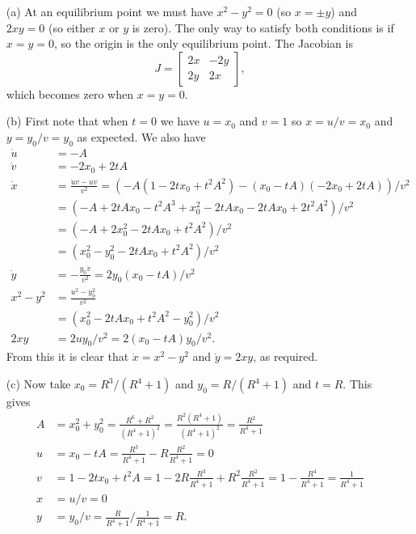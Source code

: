\documentclass[a4paper]{amsart}
\begin{document}
\begin{solution}\leavevmode
 \begin{itemize}
  \item[(a)] At an equilibrium point we must have $x^2-y^2=0$ (so
   $x=\pm y$) and $2xy=0$ (so either $x$ or $y$ is zero).  The only
   way to satisfy both conditions is if $x=y=0$, so the origin is the
   only equilibrium point.  The Jacobian is 
   \[ J=\left[\begin{array}{cc} 2x&-2y\\ 2y&2x\end{array}\right], \]
   which becomes zero when $x=y=0$.
  \item[(b)] First note that when $t=0$ we have $u=x_0$ and $v=1$ so
   $x=u/v=x_0$ and $y=y_0/v=y_0$ as expected.  We also have
   \begin{align*}
    \dot{u} &= -A \\
    \dot{v} &= -2x_0 +2tA \\
    \dot{x} &= \frac{\dot{u}v-u\dot{v}}{v^2} 
             = (-A(1-2tx_0+t^2A^2)-(x_0-tA)(-2x_0+2tA))/v^2 \\
            &= (-A+2tAx_0-t^2A^3+x_0^2-2tAx_0-2tAx_0+2t^2A^2)/v^2 \\
            &= (-A+2x_0^2-2tAx_0+t^2A^2)/v^2 \\
            &= (x_0^2-y_0^2-2tAx_0+t^2A^2)/v^2 \\
    \dot{y} &= -\frac{y_0\dot{v}}{v^2} = 2y_0(x_0-tA)/v^2 \\
    x^2-y^2 &= \frac{u^2-y_0^2}{v^2} \\
            &= (x_0^2-2tAx_0+t^2A^2-y_0^2)/v^2 \\
    2xy     &= 2uy_0/v^2 = 2(x_0-tA)y_0/v^2.
   \end{align*}
   From this it is clear that $\dot{x}=x^2-y^2$ and $\dot{y}=2xy$, as
   required.
  \item[(c)] Now take $x_0=R^3/(R^4+1)$ and $y_0=R/(R^4+1)$ and
   $t=R$.  This gives 
   \begin{align*}
    A &= x_0^2+y_0^2 = \frac{R^6+R^2}{(R^4+1)^2} = \frac{R^2(R^4+1)}{(R^4+1)^2} = \frac{R^2}{R^4+1} \\
    u &= x_0-tA = \frac{R^3}{R^4+1} - R\frac{R^2}{R^4+1} = 0 \\
    v &= 1-2tx_0+t^2A = 1 - 2R\frac{R^3}{R^4+1} + R^2\frac{R^2}{R^4+1}
       = 1 - \frac{R^4}{R^4+1} = \frac{1}{R^4+1} \\
    x &= u/v = 0 \\
    y &= y_0/v = \frac{R}{R^4+1}/\frac{1}{R^4+1} = R.
   \end{align*}
 \end{itemize}
\end{solution}
\end{document}
